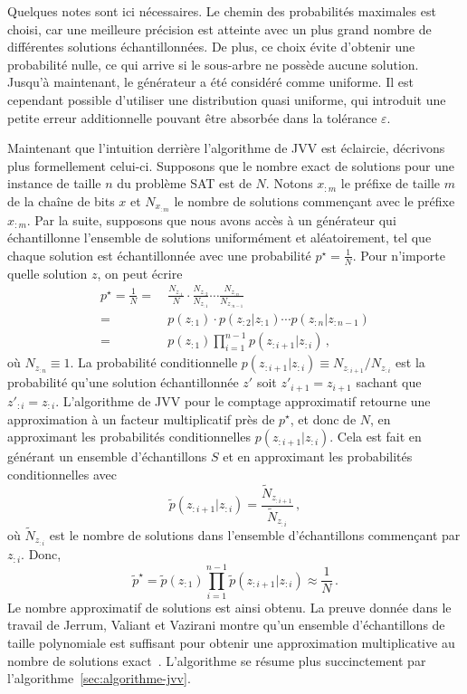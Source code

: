 Quelques notes sont ici nécessaires. Le chemin des probabilités maximales est choisi, car une meilleure précision est atteinte avec un plus grand nombre de différentes solutions échantillonnées. De plus, ce choix évite d'obtenir une probabilité nulle, ce qui arrive si le sous-arbre ne possède aucune solution. Jusqu'à maintenant, le générateur a été considéré comme uniforme. Il est cependant possible d'utiliser une distribution quasi uniforme, qui introduit une petite erreur additionnelle pouvant être absorbée dans la tolérance $\varepsilon$.

Maintenant que l'intuition derrière l'algorithme de JVV est éclaircie, décrivons plus formellement celui-ci. Supposons que le nombre exact de solutions pour une instance de taille $n$ du problème SAT est de $N$. Notons $x_{:m}$ le préfixe de taille $m$ de la chaîne de bits $x$ et $N_{x_{:m}}$ le nombre de solutions commençant avec le préfixe $x_{:m}$. Par la suite, supposons que nous avons accès à un générateur qui échantillonne l'ensemble de solutions uniformément et aléatoirement, tel que chaque solution est échantillonnée avec une probabilité $p^{\star} = \frac{1}{N}$. Pour n'importe quelle solution $z$, on peut écrire
\begin{align}
    p^\star = \frac1N =&{\ } \frac{N_{z_{:1}}}{N} \cdot \frac{N_{z_{:2}}}{N_{z_{:1}}} \cdots \frac{N_{z_{:n}}}{N_{z_{:n-1}}} \\
    =&{\ } p(z_{:1}) \cdot p(z_{:2}|z_{:1}) \cdots p(z_{:n}|z_{:n-1}) \\
    =&{\ } p(z_{:1}) \prod_{i=1}^{n-1} p(z_{:i+1}|z_{:i}) \,,
\end{align}
où $N_{z_{:n}} \equiv 1$. La probabilité conditionnelle $p(z_{:i+1}|z_{:i}) \equiv N_{z_{:i+1}} / N_{z_{:i}}$ est la probabilité qu'une solution échantillonnée $z'$ soit $z'_{i+1} = z_{i+1}$ sachant que $z'_{:i} = z_{:i}$. L'algorithme de JVV pour le comptage approximatif retourne une approximation à un facteur multiplicatif près de $p^{\star}$, et donc de $N$, en approximant les probabilités conditionnelles $p(z_{:i+1}|z_{:i})$. Cela est fait en générant un ensemble d'échantillons $S$ et en approximant les probabilités conditionnelles avec
\begin{equation}
    \tilde p(z_{:i+1}|z_{:i}) = \frac{ \tilde N_{z_{:i+1}} }{ \tilde N_{z_{:i}} } \,,
\end{equation}
où $\tilde{N}_{z_{:i}}$ est le nombre de solutions dans l'ensemble d'échantillons commençant par $z_{:i}$. Donc,
\begin{equation}
    \tilde p^\star = \tilde p(z_{:1}) \prod_{i=1}^{n-1} \tilde p(z_{:i+1}|z_{:i}) \approx \frac1N \,.
\end{equation}
Le nombre approximatif de solutions est ainsi obtenu. La preuve donnée dans le travail de Jerrum, Valiant et Vazirani montre qu'un ensemble d'échantillons de taille polynomiale est suffisant pour obtenir une approximation multiplicative au nombre de solutions exact~\cite{jerrumRandomGenerationCombinatorial1986}. L'algorithme se résume plus succinctement par l'algorithme~\ref{sec:algorithme-jvv}.

